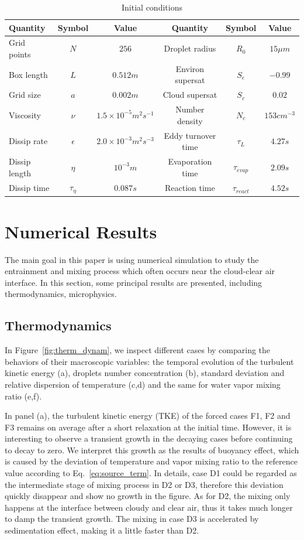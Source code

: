 \documentclass[draft,jgrga]{AGUTeX}
\newcommand{\Eq}[1]{Eq.~\eqref{#1}} \newcommand{\Fig}[1]{Figure~\ref{#1}}
\begin{document}
\begin{article}
\begin{table}
\begin{tabular}{l c c c c c}
\hline\hline
Quantity & Symbol & Value & Quantity & Symbol & Value\\
\hline
Grid points & $N$ & $256$ & Droplet radius & $R_{0}$ & $15\mu m$\\
Box length & $L$ & $0.512m$ & Environ supersat & $S_{e}$ & $-0.99$\\
Grid size & $a$ & $0.002m$ & Cloud supersat & $S_{c}$ & $0.02$\\
Viscosity & $\nu$ & $1.5\times10^{-5}m^{2}s^{-1}$ & Number density& $N_{c}$ & $153cm^{-3}$\\
Dissip rate& $\epsilon$ & $2.0\times10^{-3}m^{2}s^{-3}$ & Eddy turnover time & $\tau_{L}$ & $4.27s$\\
Dissip length& $\eta$ & $10^{-3}m$ & Evaporation time & $\tau_{evap}$ & $2.09s$\\
Dissip time& $\tau_{\eta}$ & $0.087s$ & Reaction time & $\tau_{react}$ & $4.52s$\\
\hline
\end{tabular}
\caption{Initial conditions}
\label{tb:parameters}
\end{table}

\section{Numerical Results}\label{numerical_results}
The main goal in this paper is using numerical simulation to study
the entrainment and mixing process which often occurs near the cloud-clear air interface. In this section, some principal results are presented, including thermodynamics, microphysics.

\subsection{Thermodynamics}
In \Fig{fig:therm_dynam}, we inspect different cases by comparing the behaviors of their macroscopic 
variables: the temporal evolution of the turbulent kinetic energy (a), droplets number concentration (b), standard deviation and relative dispersion of temperature (c,d) and the same for water vapor mixing ratio (e,f). 

In panel (a), the turbulent kinetic energy (TKE) of the forced cases F1, F2 and F3 remains on average after a short relaxation at the initial time. However, it is interesting to observe a transient growth in the decaying cases before continuing to decay to zero. We interpret this growth as the results of buoyancy effect, which is caused by the deviation of temperature and vapor mixing ratio to the reference value according to \Eq{eq:source_term}. In details, case D1 could be regarded as the intermediate stage of mixing process in D2 or D3, therefore this deviation quickly disappear and show no growth in the figure. As for D2, the mixing only happens at the interface between cloudy and clear air, thus it takes much longer to damp the transient growth. The mixing in case D3 is accelerated by sedimentation effect, making it a little faster than D2.


\end{article}
\end{document}
